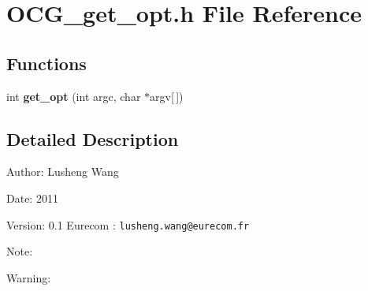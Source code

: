 \section{OCG\_\-get\_\-opt.h File Reference}
\label{OCG__get__opt_8h}
\subsection*{Functions}
\begin{CompactItemize}
\item 
int {\bf get\_\-opt} (int argc, char $\ast$argv[$\,$])
\end{CompactItemize}


\subsection{Detailed Description}
\begin{Desc}
\item[Author:]Lusheng Wang \end{Desc}
\begin{Desc}
\item[Date:]2011 \end{Desc}
\begin{Desc}
\item[Version:]0.1  Eurecom : {\tt lusheng.wang@eurecom.fr} \end{Desc}
\begin{Desc}
\item[Note:]\end{Desc}
\begin{Desc}
\item[Warning:]\end{Desc}
